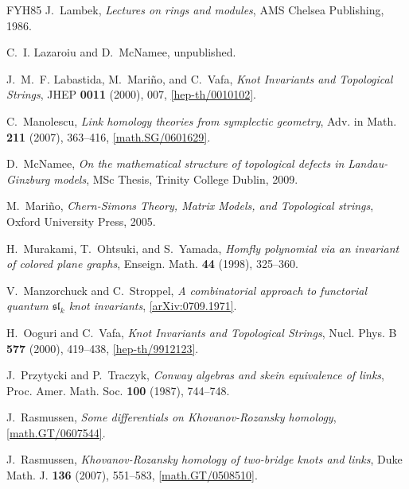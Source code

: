 \documentclass{compositio}
\theoremstyle{definition}
\numberwithin{equation}{section}
\begin{document}
\begin{thebibliography}{FYH{\etalchar{+}}85}
J.~Lambek, \emph{Lectures on rings and modules}, AMS Chelsea Publishing, 1986.

C.~I. Lazaroiu and D.~McNamee, unpublished.

J.~M.~F. Labastida, M.~Mari\~{n}o, and C.~Vafa, \emph{Knot {I}nvariants and
  {T}opological {S}trings}, JHEP \textbf{0011} (2000), 007,
  \href{http://arxiv.org/abs/hep-th/0010102}{[hep-th/0010102]}.

C.~Manolescu, \emph{Link homology theories from symplectic geometry}, Adv. in
  Math. \textbf{211} (2007), 363--416,
  \href{http://www.arxiv.org/abs/math.AG/0601629}{[math.SG/0601629]}.

D.~McNamee, \emph{On the mathematical structure of topological defects in
  {L}andau-{G}inzburg models}, MSc Thesis, Trinity College Dublin, 2009.

M.~Mari\~{n}o, \emph{Chern-{S}imons {T}heory, {M}atrix {M}odels, and
  {T}opological s{t}rings}, Oxford University Press, 2005.

H.~Murakami, T.~Ohtsuki, and S.~Yamada, \emph{Homfly polynomial via an
  invariant of colored plane graphs}, Enseign. Math. \textbf{44} (1998),
  325--360.

V.~Manzorchuck and C.~Stroppel, \emph{A combinatorial approach to functorial
  quantum {$\mathfrak{sl}_k$} knot invariants},
  \href{http://arxiv.org/abs/0709.1971}{[arXiv:0709.1971]}.

H.~Ooguri and C.~Vafa, \emph{Knot {I}nvariants and {T}opological {S}trings},
  Nucl. Phys. B \textbf{577} (2000), 419--438,
  \href{http://arxiv.org/abs/hep-th/9912123}{[hep-th/9912123]}.

J.~Przytycki and P.~Traczyk, \emph{Conway algebras and skein equivalence of
  links}, Proc. Amer. Math. Soc. \textbf{100} (1987), 744--748.

J.~Rasmussen, \emph{Some differentials on {K}hovanov-{R}ozansky homology},
  \href{http://arxiv.org/abs/math/0607544}{[math.GT/0607544]}.

J.~Rasmussen, \emph{Khovanov-{R}ozansky homology of two-bridge knots and links},
  Duke Math. J. \textbf{136} (2007), 551--583,
  \href{http://arxiv.org/abs/math/0508510}{[math.GT/0508510]}.
  

\end{thebibliography}
\end{document}
